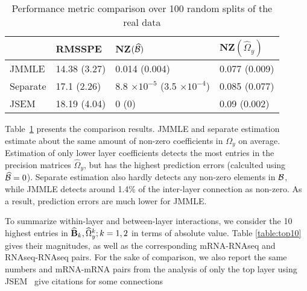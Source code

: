 \begin{table}[t]
\centering
    \begin{tabular}{llll}
    \hline
~        & RMSSPE        & NZ$(\widehat {{\cal{B}}})$  & NZ$(\widehat \Omega_y)$  \\\hline
JMMLE    & 14.38 (3.27) & 0.014 (0.004) & 0.077 (0.009) \\
Separate & 17.1 (2.26)  & 8.8 $\times 10^{-5}$ (3.5 $\times 10^{-4}$) & 0.085 (0.077) \\
JSEM     & 18.19 (4.04) & 0 (0)             & 0.09 (0.002) \\\hline
    \end{tabular}
    \caption{Performance metric comparison over 100 random splits of the real data}
    \label{table:real-compare}
\end{table}
%
Table~\ref{table:real-compare} presents the comparison results. JMMLE and separate estimation estimate about the same amount of non-zero coefficients in $\Omega_y$ on average. Estimation of only lower layer coefficients detects the most entries in the precision matrices $\widehat \Omega_y$, but has the highest prediction errors (calculted using $\widehat {{\cal{B}}} = 0$). Separate estimation also hardly detects any non-zero elements in ${\cal{B}}$, while JMMLE detects around 1.4\% of the inter-layer connection as non-zero. As a result, prediction errors are much lower for JMMLE.

To summarize within-layer and between-layer interactions, we consider the 10 highest entries in $\widehat {{\mathbf{B}}}_k, \widehat \Omega_y^k; k = 1,2$ in terms of absolute value. Table \ref{table:top10} gives their magnitudes, as well as the corresponding mRNA-RNAseq and RNAseq-RNAseq pairs. For the sake of comparison, we also report the same numbers and mRNA-mRNA pairs from the analysis of only the top layer using JSEM~\citep{MaMichailidis15} {\colrbf give citations for some connections}

